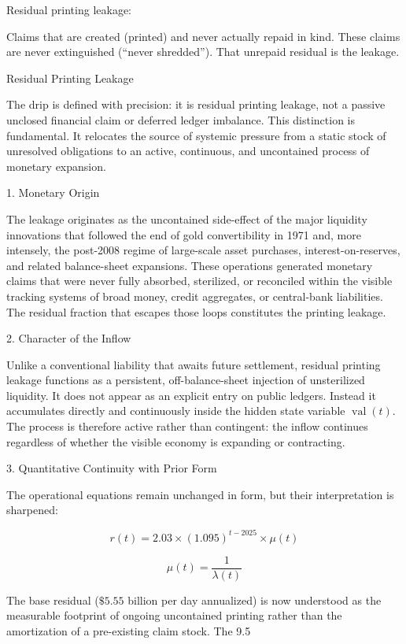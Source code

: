 Residual printing leakage:

Claims that are created (printed) and never actually repaid in kind.  
These claims are never extinguished (“never shredded”).  
That unrepaid residual is the leakage.

Residual Printing Leakage

The drip is defined with precision: it is residual printing leakage, not a passive unclosed financial claim or deferred ledger imbalance. This distinction is fundamental. It relocates the source of systemic pressure from a static stock of unresolved obligations to an active, continuous, and uncontained process of monetary expansion.

1. Monetary Origin

The leakage originates as the uncontained side-effect of the major liquidity innovations that followed the end of gold convertibility in 1971 and, more intensely, the post-2008 regime of large-scale asset purchases, interest-on-reserves, and related balance-sheet expansions. These operations generated monetary claims that were never fully absorbed, sterilized, or reconciled within the visible tracking systems of broad money, credit aggregates, or central-bank liabilities. The residual fraction that escapes those loops constitutes the printing leakage.

2. Character of the Inflow

Unlike a conventional liability that awaits future settlement, residual printing leakage functions as a persistent, off-balance-sheet injection of unsterilized liquidity. It does not appear as an explicit entry on public ledgers. Instead it accumulates directly and continuously inside the hidden state variable \(\operatorname{val}(t)\). The process is therefore active rather than contingent: the inflow continues regardless of whether the visible economy is expanding or contracting.

3. Quantitative Continuity with Prior Form

The operational equations remain unchanged in form, but their interpretation is sharpened:

\[
r(t) = 2.03 \times (1.095)^{t-2025} \times \mu(t)
\]

\[
\mu(t) = \frac{1}{\lambda(t)}
\]

The base residual (\( \$5.55 \) billion per day annualized) is now understood as the measurable footprint of ongoing uncontained printing rather than the amortization of a pre-existing claim stock. The 9.5 %

